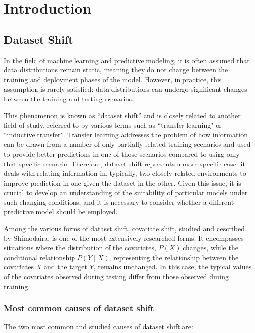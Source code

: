 \chapter{Introduction}


\section{Dataset Shift}


In the field of machine learning and predictive modeling, it is often assumed that data distributions remain static, meaning they do not change between the training and deployment phases of the model. However, in practice, this assumption is rarely satisfied: data distributions can undergo significant changes between the training and testing scenarios.

This phenomenon is known as ``dataset shift''\cite{shiftbook} and is closely related to another field of study, referred to by various terms such as ``transfer learning" or ``inductive transfer". Transfer learning addresses the problem of how information can be drawn from a number of only partially related training scenarios and used to provide better predictions in one of those scenarios compared to using only that specific scenario. Therefore, dataset shift represents a more specific case: it deals with relating information in, typically, two closely related environments to improve prediction in one given the dataset in the other. Given this issue, it is crucial to develop an understanding of the suitability of particular models under such changing conditions, and it is necessary to consider whether a different predictive model should be employed.

Among the various forms of dataset shift, covariate shift, studied and described by Shimodaira\cite{SHIMODAIRA2000227}, is one of the most extensively researched forms. It encompasses situations where the distribution of the covariates, $P(X)$ changes, while the conditional relationship $P(Y \mid X)$, representing the relationship between the covariates $X$ and the target $Y$, remains unchanged. In this case, the typical values of the covariates observed during testing differ from those observed during training.

	
\subsection{Most common causes of dataset shift}
	
The two most common and studied causes of dataset shift are:

